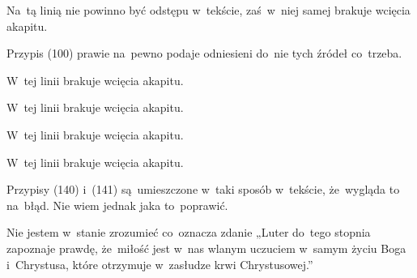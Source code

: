 \documentclass[a4paper,11pt]{article}
\numberwithin{equation}{section}
\begin{document}
\noindent
{} Na~tą linią nie powinno być odstępu w~tekście,
zaś~w~niej samej brakuje wcięcia akapitu.

\VerSpaceFour





\noindent
{} Przypis (100) prawie na~pewno podaje odniesieni do~nie tych
źródeł co~trzeba.

\VerSpaceFour





\noindent
{} W~tej linii brakuje wcięcia akapitu.

\VerSpaceFour





\noindent
{} W~tej linii brakuje wcięcia akapitu.

\VerSpaceFour





\noindent
{} W~tej linii brakuje wcięcia akapitu.

\VerSpaceFour





\noindent
{} W~tej linii brakuje wcięcia akapitu.

\VerSpaceFour





\noindent
{} Przypisy (140) i~(141) są~umieszczone w~taki sposób w~tekście,
że~wygląda to na~błąd. Nie wiem jednak jaka to~poprawić.

\VerSpaceFour





\noindent
{} Nie jestem w~stanie zrozumieć co~oznacza zdanie
„Luter do~tego stopnia zapoznaje prawdę, że~miłość jest w~nas wlanym
uczuciem w~samym życiu Boga i~Chrystusa, które otrzymuje w~zasłudze
krwi Chrystusowej.”

\VerSpaceFour





\newpage

\end{document}
